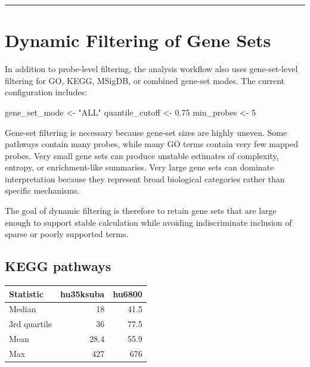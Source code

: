 \documentclass[
  letterpaper,
  DIV=11,
  numbers=noendperiod,
  openany,
  oneside]{scrreprt}
\newenvironment{Shaded}{\begin{snugshade}}{\end{snugshade}}
\newcommand{\DecValTok}[1]{\textcolor[rgb]{0.68,0.00,0.00}{#1}}
\newcommand{\FloatTok}[1]{\textcolor[rgb]{0.68,0.00,0.00}{#1}}
\newcommand{\NormalTok}[1]{\textcolor[rgb]{0.00,0.23,0.31}{#1}}
\newcommand{\OtherTok}[1]{\textcolor[rgb]{0.00,0.23,0.31}{#1}}
\newcommand{\StringTok}[1]{\textcolor[rgb]{0.13,0.47,0.30}{#1}}
\begin{document}
\begin{center}\rule{0.5\linewidth}{0.5pt}\end{center}

\section{Dynamic Filtering of Gene
Sets}\label{dynamic-filtering-of-gene-sets}

In addition to probe-level filtering, the analysis workflow also uses
gene-set-level filtering for GO, KEGG, MSigDB, or combined gene-set
modes. The current configuration includes:

\begin{Shaded}
\begin{Highlighting}[]
\NormalTok{gene\_set\_mode   }\OtherTok{\textless{}{-}} \StringTok{"ALL"}
\NormalTok{quantile\_cutoff }\OtherTok{\textless{}{-}} \FloatTok{0.75}
\NormalTok{min\_probes      }\OtherTok{\textless{}{-}} \DecValTok{5}
\end{Highlighting}
\end{Shaded}

Gene-set filtering is necessary because gene-set sizes are highly
uneven. Some pathways contain many probes, while many GO terms contain
very few mapped probes. Very small gene sets can produce unstable
estimates of complexity, entropy, or enrichment-like summaries. Very
large gene sets can dominate interpretation because they represent broad
biological categories rather than specific mechanisms.

The goal of dynamic filtering is therefore to retain gene sets that are
large enough to support stable calculation while avoiding indiscriminate
inclusion of sparse or poorly supported terms.

\subsection{KEGG pathways}\label{kegg-pathways}

\begin{longtable}[]{@{}lrr@{}}
\toprule\noalign{}
Statistic & hu35ksuba & hu6800 \\
\midrule\noalign{}
\endhead
\bottomrule\noalign{}
\endlastfoot
Median & 18 & 41.5 \\
3rd quartile & 36 & 77.5 \\
Mean & 28.4 & 55.9 \\
Max & 427 & 676 \\
\end{longtable}
\end{document}
